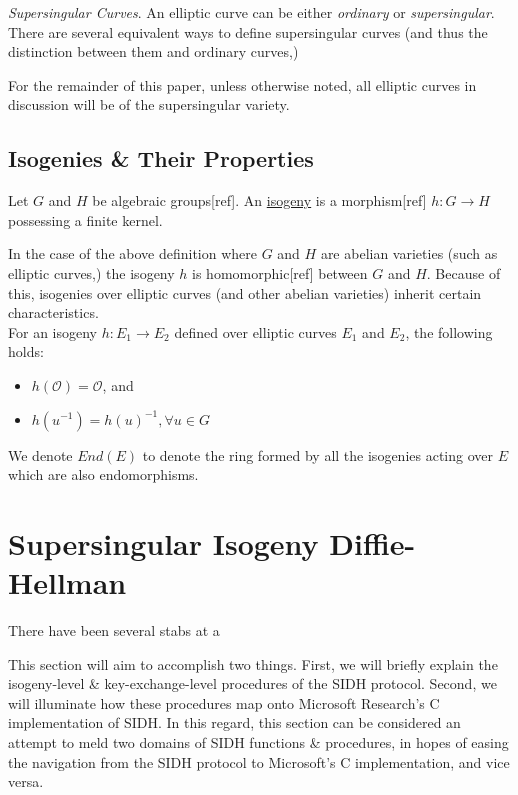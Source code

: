 \noindent
\emph{Supersingular Curves}. An elliptic curve can be either \emph{ordinary} or \emph{supersingular}. There are several equivalent ways to define supersingular curves (and thus the distinction between them and ordinary curves,)

For the remainder of this paper, unless otherwise noted, all elliptic curves in discussion will be of the supersingular variety.

\subsection{Isogenies \& Their Properties}

\begin{definition}[Isogeny]
\label{defn:isogeny}
Let $G$ and $H$ be algebraic groups[ref]. An \underline{isogeny} is a morphism[ref] $h: G \rightarrow H$ possessing a finite kernel.
\end{definition}
In the case of the above definition where $G$ and $H$ are abelian varieties (such as elliptic curves,) the isogeny $h$ is homomorphic[ref] between $G$ and $H$. Because of this, isogenies over elliptic curves (and other abelian varieties) inherit certain characteristics.\\
For an isogeny $h: E_{1} \rightarrow E_{2}$ defined over elliptic curves $E_1$ and $E_2$, the following holds:
\begin{itemize}
\item $h(\mathcal{O}) = \mathcal{O}$, and
\item $h(u^{-1}) = h(u)^{-1}, \forall u \in G$
\end{itemize}

We denote $End(E)$ to denote the ring formed by all the isogenies acting over $E$ which are also endomorphisms.

\section{Supersingular Isogeny Diffie-Hellman}

There have been several stabs at a

This section will aim to accomplish two things. First, we will briefly explain the isogeny-level \& key-exchange-level procedures of the SIDH protocol. Second, we will illuminate how these procedures map onto Microsoft Research's C implementation of SIDH. In this regard, this section can be considered an attempt to meld two domains of SIDH functions \& procedures, in hopes of easing the navigation from the SIDH protocol to Microsoft's C implementation, and vice versa.

